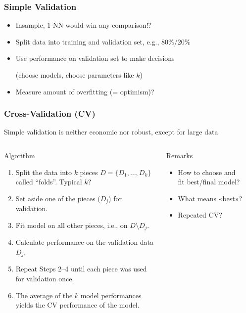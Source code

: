 \documentclass[
    utf8,
    aspectratio=169
]{beamer}  %
\begin{document}
\begin{frame}
	\frametitle{Simple Validation}
	\begin{itemize}
		\item Insample, 1-NN would win any comparison!?
		\item Split data into training and validation set, e.g., 80\%/20\%
		\item Use performance on validation set to make decisions 
		
		(choose models, choose parameters like $k$)
		\item Measure amount of overfitting (= optimism)?
	\end{itemize}

	\vfill
	
	\begin{example}
	\end{example}
\end{frame}

\begin{frame}
	\frametitle{Cross-Validation (CV)}
	
	Simple validation is neither economic nor robust, except for large data
	
	\vfill
	
	\begin{columns}[onlytextwidth]
		\begin{block}{Algorithm}
			\begin{enumerate}
				\item Split the data into $k$ pieces $D = \{D_1, \dots, D_k\}$ called ``folds''. Typical $k$?
				\item Set aside one of the pieces ($D_j$) for validation.
				\item Fit model on all other pieces, i.e., on $D \setminus D_j$.
				\item Calculate performance on the validation data $D_j$.
				\item Repeat Steps 2--4 until each piece was used for validation once.
				\item The average of the $k$ model performances yields the \alert{CV performance} of the model.
			\end{enumerate}
		\end{block}
		
		\begin{alertblock}{Remarks}
			\begin{itemize}
				\item How to choose and fit best/final model? 
				\item What means «best»?
				\item Repeated CV?
			\end{itemize}
		\end{alertblock}
	
		\begin{example}
		\end{example}
	\end{columns}
\end{frame}
\end{document}

